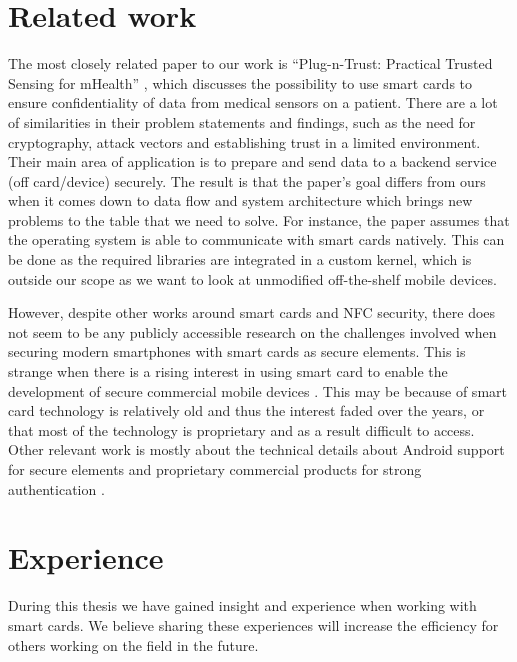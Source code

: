 \section{Related work}
The most closely related paper to our work is ``Plug-n-Trust: Practical Trusted Sensing for mHealth'' \cite{plugntrust}, which discusses the possibility to use smart cards to ensure confidentiality of data from medical sensors on a patient. There are a lot of similarities in their problem statements and findings, such as the need for cryptography, attack vectors and establishing trust in a limited environment. Their main area of application is to prepare and send data to a backend service (off card/device) securely. The result is that the paper's goal differs from ours when it comes down to data flow and system architecture which brings new problems to the table that we need to solve. For instance, the paper assumes that the operating system is able to communicate with smart cards natively. This can be done as the required libraries are integrated in a custom kernel, which is outside our scope as we want to look at unmodified off-the-shelf mobile devices.

However, despite other works around smart cards and NFC security, there does not seem to be any publicly accessible research on the challenges involved when securing modern smartphones with smart cards as secure elements. This is strange when there is a rising interest in using smart card to enable the development of secure commercial mobile devices \cite{tiger, secursmart}. This may be because of smart card technology is relatively old and thus the interest faded over the years, or that most of the technology is proprietary and as a result difficult to access. Other relevant work is mostly about the technical details about Android support for secure elements \cite{SEEK, secInternals} and proprietary commercial products for strong authentication \cite{GemaltoIDGo800}.

\section{Experience}
\label{sec:experience}
During this thesis we have gained insight and experience when working with smart cards. We believe sharing these experiences will increase the efficiency for others working on the field in the future.

